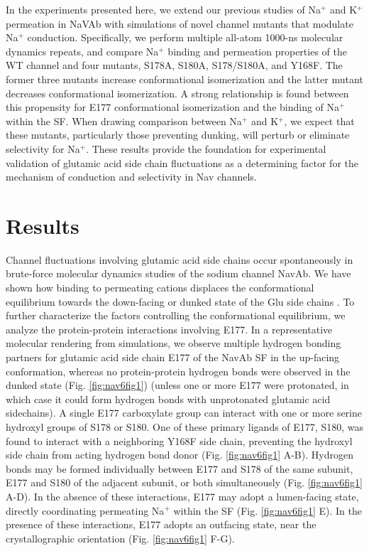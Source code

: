 \begin{refsection}
In the experiments presented here, we extend our previous studies of Na$^+$ and K$^+$ permeation in NaVAb \cite{Chakrabarti:2013kd} with simulations of novel channel mutants that modulate Na$^+$ conduction. Specifically, we perform multiple all-atom 1000-ns molecular dynamics repeats, and compare Na$^+$ binding and permeation properties of the WT channel and four mutants, S178A, S180A, S178/S180A, and Y168F. The former three mutants increase conformational isomerization and the latter mutant decreases conformational isomerization. A strong relationship is found between this propensity for E177 conformational isomerization and the binding of Na$^+$ within the SF. When drawing comparison between Na$^+$ and K$^+$, we expect that these mutants, particularly those preventing dunking, will perturb or eliminate selectivity for Na$^+$. These results provide the foundation for experimental validation of glutamic acid side chain fluctuations as a determining factor for the mechanism of conduction and selectivity in Nav channels.

\section{Results}

Channel fluctuations involving glutamic acid side chains occur spontaneously in brute-force molecular dynamics studies of the sodium channel NavAb. We have shown how binding to permeating cations displaces the conformational equilibrium towards the down-facing or dunked state of the Glu side chains \cite{Chakrabarti:2013kd}. To further characterize the factors controlling the conformational equilibrium, we analyze the protein-protein interactions involving E177. In a representative molecular rendering from simulations, we observe multiple hydrogen bonding partners for glutamic acid side chain E177 of the NavAb SF in the up-facing conformation, whereas no protein-protein hydrogen bonds were observed in the dunked state (Fig. \ref{fig:nav6fig1}) (unless one or more E177 were protonated, in which case it could form hydrogen bonds with unprotonated glutamic acid sidechains). A single E177 carboxylate group can interact with one or more serine hydroxyl groups of S178 or S180. One of these primary ligands of E177, S180, was found to interact with a neighboring Y168F side chain, preventing the hydroxyl side chain from acting hydrogen bond donor (Fig. \ref{fig:nav6fig1} A-B). Hydrogen bonds may be formed individually between E177 and S178 of the same subunit, E177 and S180 of the adjacent subunit, or both simultaneously (Fig. \ref{fig:nav6fig1} A-D). In the absence of these interactions, E177 may adopt a lumen-facing state, directly coordinating permeating Na$^+$ within the SF (Fig. \ref{fig:nav6fig1} E). In the presence of these interactions, E177 adopts an outfacing state, near the crystallographic orientation (Fig. \ref{fig:nav6fig1} F-G). 


\end{refsection}
